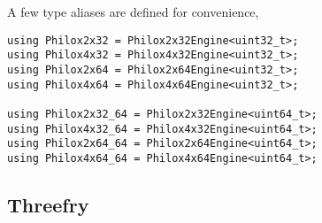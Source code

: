 A few type aliases are defined for convenience,
\begin{verbatim}
using Philox2x32 = Philox2x32Engine<uint32_t>;
using Philox4x32 = Philox4x32Engine<uint32_t>;
using Philox2x64 = Philox2x64Engine<uint32_t>;
using Philox4x64 = Philox4x64Engine<uint32_t>;

using Philox2x32_64 = Philox2x32Engine<uint64_t>;
using Philox4x32_64 = Philox4x32Engine<uint64_t>;
using Philox2x64_64 = Philox2x64Engine<uint64_t>;
using Philox4x64_64 = Philox4x64Engine<uint64_t>;
\end{verbatim}

\subsection{Threefry}
\label{sub:Threefry}


